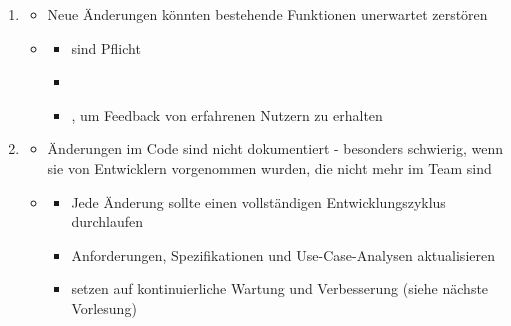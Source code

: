 \begin{infoBox}[title=Kritische Herausforderungen der Software Evolution]
    \begin{enumerate}
        \item {}
        \begin{itemize}
            \item Neue Änderungen könnten bestehende Funktionen unerwartet zerstören
            \item {}
            \begin{itemize}
                \item {} sind Pflicht
                \item {}
                \item {}, um Feedback von erfahrenen Nutzern zu erhalten
            \end{itemize}
        \end{itemize}
        \item {}
        \begin{itemize}
            \item {} Änderungen im Code sind nicht dokumentiert - besonders schwierig, wenn sie von Entwicklern vorgenommen wurden, die nicht mehr im Team sind
            \item {}
            \begin{itemize}
                \item Jede Änderung sollte einen vollständigen Entwicklungszyklus durchlaufen
                \item Anforderungen, Spezifikationen und Use-Case-Analysen aktualisieren
                \item {} setzen auf kontinuierliche Wartung und Verbesserung (siehe nächste Vorlesung)
            \end{itemize}
        \end{itemize}
    \end{enumerate}
\end{infoBox}
